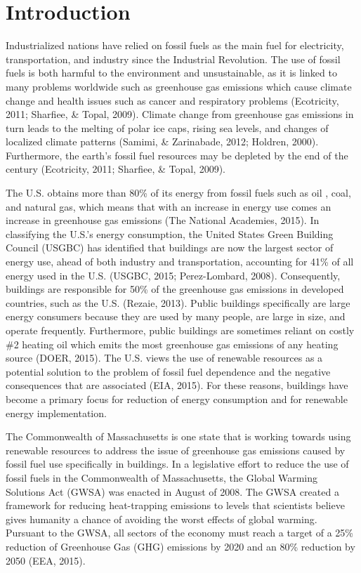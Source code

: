 
\chapter{Introduction}
\par Industrialized nations have relied on fossil fuels as the main fuel for electricity, transportation, and industry since the Industrial Revolution. The use of fossil fuels is both harmful to the environment and unsustainable, as it is linked to many problems worldwide such as greenhouse gas emissions which cause climate change and health issues such as cancer and respiratory problems (Ecotricity, 2011; Sharfiee, \& Topal, 2009). Climate change from greenhouse gas emissions in turn leads to the melting of polar ice caps, rising sea levels, and changes of localized climate patterns (Samimi, \& Zarinabade, 2012; Holdren, 2000). Furthermore, the earth's fossil fuel resources may be depleted by the end of the century (Ecotricity, 2011; Sharfiee, \& Topal, 2009).
\par The U.S. obtains more than 80\% of its energy from fossil fuels such as oil , coal, and natural gas, which means that with an increase in energy use comes an increase in greenhouse gas emissions (The National Academies, 2015). In classifying the U.S.'s energy consumption, the United States Green Building Council (USGBC) has identified that buildings are now the largest sector of energy use, ahead of both industry and transportation, accounting for 41\% of all energy used in the U.S. (USGBC, 2015; Perez-Lombard, 2008). Consequently, buildings are responsible for 50\% of the greenhouse gas emissions in developed countries, such as the U.S. (Rezaie, 2013). Public buildings specifically are large energy consumers because they are used by many people, are large in size, and operate frequently. Furthermore, public buildings are sometimes reliant on costly \#2 heating oil which emits the most greenhouse gas emissions of any heating source (DOER, 2015). The U.S. views the use of renewable resources as a potential solution to the problem of fossil fuel dependence and the negative consequences that are associated (EIA, 2015). For these reasons, buildings have become a primary focus for reduction of energy consumption and for renewable energy implementation.
\par The Commonwealth of Massachusetts is one state that is working towards using renewable resources to address the issue of greenhouse gas emissions caused by fossil fuel use specifically in buildings. In a legislative effort to reduce the use of fossil fuels in the Commonwealth of Massachusetts, the Global Warming Solutions Act (GWSA) was enacted in August of 2008. The GWSA created a framework for reducing heat-trapping emissions to levels that scientists believe gives humanity a chance of avoiding the worst effects of global warming. Pursuant to the GWSA, all sectors of the economy must reach a target of a 25\% reduction of Greenhouse Gas (GHG) emissions by 2020 and an 80\% reduction by 2050  (EEA, 2015).
